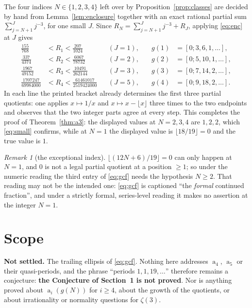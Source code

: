 \documentclass[11pt]{amsart}
\theoremstyle{definition}
\theoremstyle{remark}
\newtheorem*{remark}{Remark}
\DeclareMathOperator{\PQ}{a}
\newcommand{\Rt}{R}
\begin{document}
The four indices $N\in\{1,2,3,4\}$ left over by
Proposition~\ref{prop:classes} are decided by hand from
Lemma~\ref{lem:enclosure} together with an exact rational partial sum
$\sum_{j=N+1}^{J}j^{-3}$, for one small $J$. Since
$\Rt_N=\sum_{j=N+1}^{J}j^{-3}+\Rt_J$, applying \eqref{eq:enc} at $J$ gives
\begin{equation}\label{eq:small}
\begin{aligned}
 \tfrac{155}{768}&<\Rt_1<\tfrac{207}{1024}
   &&(J=1), &\quad g(1)&=[0;3,6,1,\ldots],\\
 \tfrac{337}{4374}&<\Rt_2<\tfrac{6067}{78732}
   &&(J=2), &\quad g(2)&=[0;5,10,1,\ldots],\\
 \tfrac{1967}{49152}&<\Rt_3<\tfrac{10491}{262144}
   &&(J=3), &\quad g(3)&=[0;7,14,2,\ldots],\\
 \tfrac{1707247}{69984000}&<\Rt_4<\tfrac{61461017}{2519424000}
   &&(J=5), &\quad g(4)&=[0;9,18,2,\ldots].
\end{aligned}
\end{equation}
In each line the printed bracket already determines the first three partial
quotients: one applies $x\mapsto1/x$ and $x\mapsto x-\lfloor x\rfloor$ three
times to the two endpoints and observes that the two integer parts agree at
every step. This completes the proof of Theorem~\ref{thm:a3}: the displayed
values at $N=2,3,4$ are $1,2,2$, which \eqref{eq:small} confirms, while at
$N=1$ the displayed value is $\lfloor18/19\rfloor=0$ and the true value is $1$.

\begin{remark}[the exceptional index]
$\lfloor(12N+6)/19\rfloor=0$ can only happen at $N=1$, and $0$ is not a legal
partial quotient at a position $\ge1$; so under the numeric reading the third
entry of \eqref{eq:gcf} needs the hypothesis $N\ge2$. That reading may not be
the intended one: \eqref{eq:gcf} is captioned ``the \emph{formal} continued
fraction'', and under a strictly formal, series-level reading it makes no
assertion at the integer $N=1$.
\end{remark}

\section{Scope}\label{sec:status}

\noindent\textbf{Not settled.} The trailing ellipsis of
\eqref{eq:gcf}. Nothing here addresses $\PQ_4$, $\PQ_5$ or their
quasi-periods, and the phrase ``periods $1,1,19,\ldots$'' therefore remains a
conjecture: \textbf{the Conjecture of Section~1 is not proved}. Nor is anything
proved about $\PQ_i(g(N))$ for $i\ge4$, about the growth of the quotients, or
about irrationality or normality questions for $\zeta(3)$.
\end{document}
